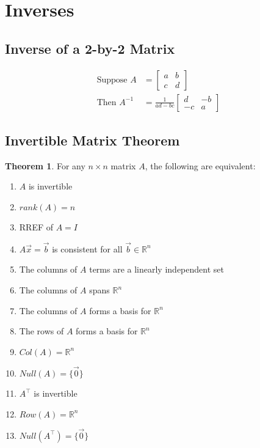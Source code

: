\documentclass[12pt]{article}
\theoremstyle{definition}
\newtheorem*{theorem}{Theorem}
\begin{document}
\section{Inverses}
\subsection{Inverse of a 2-by-2 Matrix}
\begin{align*}
  \text{Suppose } A &=
  \begin{bmatrix}
    a & b \\
    c & d
  \end{bmatrix} \\
  \text{Then } A^{-1} &= \frac{1}{ad - bc}
  \begin{bmatrix}
    d & -b \\
    -c & a
  \end{bmatrix}
\end{align*}

\subsection{Invertible Matrix Theorem}
\begin{theorem}
  For any $n \times n$ matrix $A$, the following are equivalent:
  \begin{enumerate}
    \item $A$ is invertible
    \item $rank(A) = n$
    \item RREF of $A = I$
    \item $A\vec{x} = \vec{b}$ is consistent for all $\vec{b} \in \mathbb{R}^{n}$
    \item The columns of $A$ terms are a linearly independent set
    \item The columns of $A$ spans $\mathbb{R}^{n}$
    \item The columns of $A$ forms a basis for $\mathbb{R}^{n}$
    \item The rows of $A$ forms a basis for $\mathbb{R}^{n}$
    \item $Col(A) = \mathbb{R}^{n}$
    \item $Null(A) = \{\vec{0}\}$
    \item $A^{\intercal}$ is invertible
    \item $Row(A) = \mathbb{R}^{n}$
    \item $Null(A^{\intercal}) = \{\vec{0}\}$
  \end{enumerate}
\end{theorem}

\clearpage
\printindex
\end{document}
